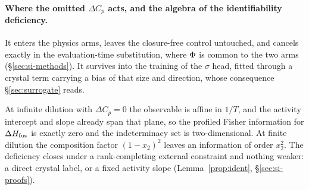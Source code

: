 \paragraph{Where the omitted $\Delta C_p$ acts, and the algebra of the identifiability deficiency.}
It enters the physics
arms, leaves the closure-free control untouched, and cancels exactly in the evaluation-time
substitution, where $\Phi$ is common to the two arms (\S\ref{sec:si-methods}). It survives into
the training of the $\sigma$ head, fitted through a crystal term carrying a bias of that size and
direction, whose consequence \S\ref{sec:surrogate} reads.

At infinite
dilution with $\Delta C_p=0$ the observable is affine in $1/T$, and the activity intercept and slope
already span that plane, so the profiled Fisher information for $\Delta H_{\mathrm{fus}}$ is exactly zero and the
indeterminacy set is two-dimensional. At finite dilution the composition factor $(1-x_2)^2$ leaves an
information of order $x_2^2$. The deficiency closes under a rank-completing external constraint and
nothing weaker: a direct crystal label, or a fixed activity slope (Lemma~\ref{prop:ident},
\S\ref{sec:si-proofs}).

